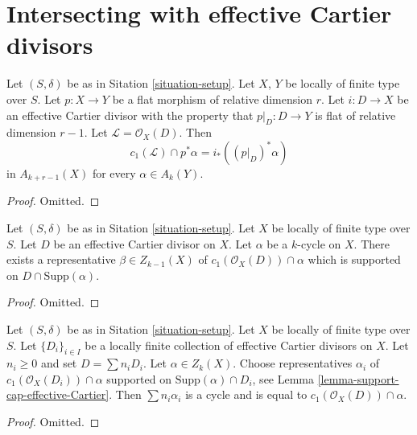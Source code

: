 \section{Intersecting with effective Cartier divisors}
\label{section-intersecting-effective-Cartier}


\begin{lemma}
\label{lemma-relative-effective-cartier}
Let $(S, \delta)$ be as in Sitation \ref{situation-setup}.
Let $X$, $Y$ be locally of finite type over $S$.
Let $p : X \to Y$ be a flat morphism of relative dimension $r$.
Let $i : D \to X$ be an effective Cartier divisor with the property
that $p|_D : D \to Y$ is flat of relative dimension $r - 1$.
Let $\mathcal{L} = \mathcal{O}_X(D)$.
Then
$$
c_1(\mathcal{L}) \cap p^*\alpha = i_* ((p|_D)^*\alpha)
$$
in $A_{k + r - 1}(X)$ for every $\alpha \in A_k(Y)$.
\end{lemma}

\begin{proof}
Omitted.
\end{proof}

\begin{lemma}
\label{lemma-support-cap-effective-Cartier}
Let $(S, \delta)$ be as in Sitation \ref{situation-setup}.
Let $X$ be locally of finite type over $S$.
Let $D$ be an effective Cartier divisor on $X$.
Let $\alpha$ be a $k$-cycle on $X$.
There exists a representative $\beta \in Z_{k - 1}(X)$ of
$c_1(\mathcal{O}_X(D)) \cap \alpha$ which is
supported on $D \cap \text{Supp}(\alpha)$.
\end{lemma}

\begin{proof}
Omitted.
\end{proof}


\begin{lemma}
\label{lemma-improved-additivity}
Let $(S, \delta)$ be as in Sitation \ref{situation-setup}.
Let $X$ be locally of finite type over $S$.
Let $\{D_i\}_{i \in I}$ be a locally finite collection
of effective Cartier divisors on $X$. Let $n_i \geq 0$
and set $D = \sum n_i D_i$.
Let $\alpha \in Z_k(X)$. Choose representatives
$\alpha_i$ of $c_1(\mathcal{O}_X(D_i)) \cap \alpha$
supported on $\text{Supp}(\alpha) \cap D_i$, see
Lemma \ref{lemma-support-cap-effective-Cartier}.
Then $\sum n_i \alpha _i$ is a cycle and is equal
to $c_1(\mathcal{O}_X(D)) \cap \alpha$.
\end{lemma}

\begin{proof}
Omitted.
\end{proof}

